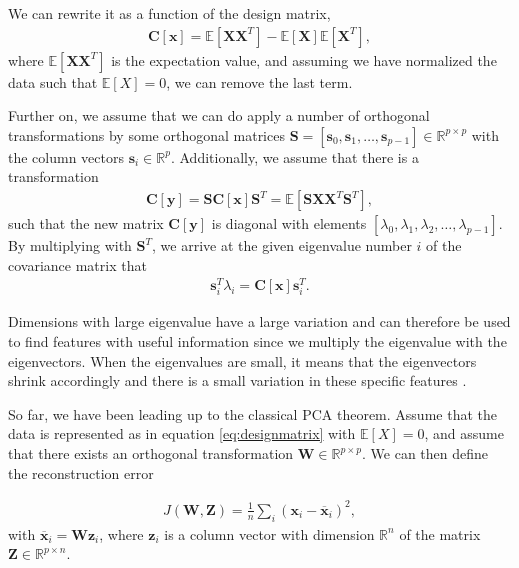 \noindent We can rewrite it as a function of the design matrix,
\begin{align}
  \boldsymbol{C}[\boldsymbol{x}] = \mathbb{E}[\boldsymbol{X}\boldsymbol{X}^T] - \mathbb{E}[\boldsymbol{X}] \mathbb{E}[\boldsymbol{X}^T],
\end{align}
where $\mathbb{E}[\boldsymbol{X}\boldsymbol{X}^T]$ is the expectation value, and assuming we have normalized the data such that $\mathbb{E}[X] = 0$, we can remove the last term.

Further on, we assume that we can do apply a number of orthogonal transformations by some orthogonal matrices $\boldsymbol{S}=[\boldsymbol{s}_0,\boldsymbol{s}_1,\dots,\boldsymbol{s}_{p-1}]\in {\mathbb{R}}^{p\times p}$ with the column vectors $\boldsymbol{s}_i \in {\mathbb{R}}^{p}$. Additionally, we assume that there is a transformation
\begin{align}
  \boldsymbol{C}[\boldsymbol{y}] =\boldsymbol{S}\boldsymbol{C}[\boldsymbol{x}]\boldsymbol{S}^T = \mathbb{E}[\boldsymbol{S}\boldsymbol{X}\boldsymbol{X}^T\boldsymbol{S}^T],
\end{align}
such that the new matrix $\boldsymbol{C}[\boldsymbol{y}]$ is diagonal with elements $[\lambda_0,\lambda_1,\lambda_2,\dots,\lambda_{p-1}]$. By multiplying with $\boldsymbol{S}^T$, we arrive at the given eigenvalue number $i$ of the covariance matrix that
\begin{align}
  \boldsymbol{s}^T_i\lambda_i = \boldsymbol{C}[\boldsymbol{x}]\boldsymbol{s}^T_i.
\end{align}

\noindent Dimensions with large eigenvalue have a large variation and can therefore be used to find features with useful information since we multiply the eigenvalue with the eigenvectors. When the eigenvalues are small, it means that the eigenvectors shrink accordingly and there is a small variation in these specific features \cite{Marsland2014}.

So far, we have been leading up to the classical PCA theorem. Assume that the data is represented as in equation \ref{eq:designmatrix} with $\mathbb{E}[X]=0$, and assume that there exists an orthogonal transformation $\boldsymbol{W}\in {\mathbb{R}}^{p\times p}$. We can then define the reconstruction error

\begin{align}
  J(\boldsymbol{W},\boldsymbol{Z}) = \frac{1}{n}\sum_i (\boldsymbol{x}_i - \overline{\boldsymbol{x}}_i)^2,
\end{align}
with $\overline{\boldsymbol{x}}_i = \boldsymbol{W}\boldsymbol{z}_i$, where $\boldsymbol{z}_i$ is a column vector with dimension ${\mathbb{R}}^{n}$ of the matrix
$\boldsymbol{Z}\in{\mathbb{R}}^{p\times n}$.

